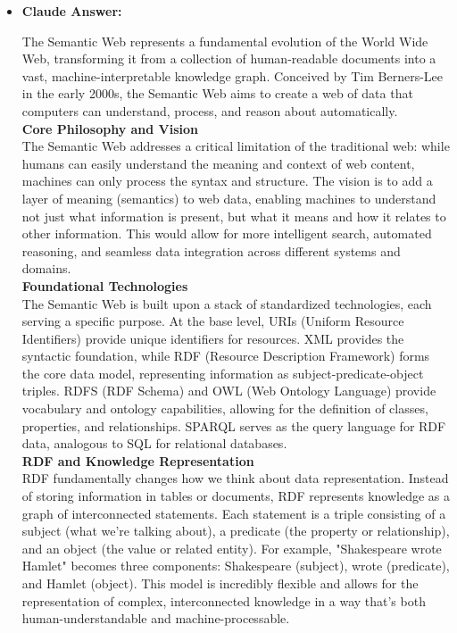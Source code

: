 \documentclass[fleqn,moreauthors,10pt]{ds_report}
\begin{document}
\begin{itemize}
  \item \textbf{Claude Answer:}


The Semantic Web represents a fundamental evolution of the World Wide Web, transforming it from a collection of human-readable documents into a vast, machine-interpretable knowledge graph. Conceived by Tim Berners-Lee in the early 2000s, the Semantic Web aims to create a web of data that computers can understand, process, and reason about automatically. \\
\textbf{Core Philosophy and Vision} \\
The Semantic Web addresses a critical limitation of the traditional web: while humans can easily understand the meaning and context of web content, machines can only process the syntax and structure. The vision is to add a layer of meaning (semantics) to web data, enabling machines to understand not just what information is present, but what it means and how it relates to other information. This would allow for more intelligent search, automated reasoning, and seamless data integration across different systems and domains. \\
\textbf{Foundational Technologies} \\
The Semantic Web is built upon a stack of standardized technologies, each serving a specific purpose. At the base level, URIs (Uniform Resource Identifiers) provide unique identifiers for resources. XML provides the syntactic foundation, while RDF (Resource Description Framework) forms the core data model, representing information as subject-predicate-object triples. RDFS (RDF Schema) and OWL (Web Ontology Language) provide vocabulary and ontology capabilities, allowing for the definition of classes, properties, and relationships. SPARQL serves as the query language for RDF data, analogous to SQL for relational databases. \\
\textbf{RDF and Knowledge Representation} \\
RDF fundamentally changes how we think about data representation. Instead of storing information in tables or documents, RDF represents knowledge as a graph of interconnected statements. Each statement is a triple consisting of a subject (what we're talking about), a predicate (the property or relationship), and an object (the value or related entity). For example, "Shakespeare wrote Hamlet" becomes three components: Shakespeare (subject), wrote (predicate), and Hamlet (object). This model is incredibly flexible and allows for the representation of complex, interconnected knowledge in a way that's both human-understandable and machine-processable.

\end{itemize}
\end{document}
